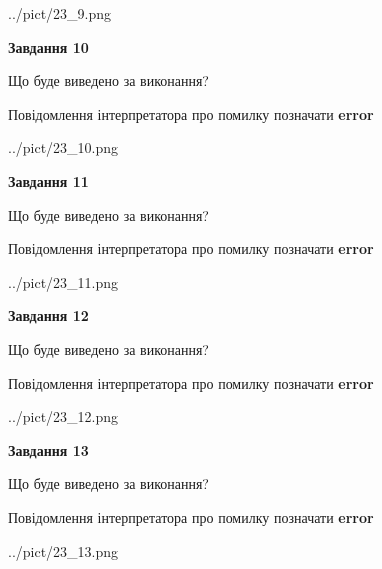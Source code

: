 \documentclass[11pt, ukrainian]{article}
\begin{document}
{\begin {large}
\begin{center}
	{../pict/23_9.png}
\end{center}
\newpage

{\begin {center}\textbf{Завдання 10}\end {center}}\par
Що буде виведено за виконання? \par
Повідомлення інтерпретатора про помилку позначати \textbf{error}

\begin{center}
	{../pict/23_10.png}
\end{center}
\newpage

{\begin {center}\textbf{Завдання 11}\end {center}}\par
Що буде виведено за виконання? \par
Повідомлення інтерпретатора про помилку позначати \textbf{error}

\begin{center}
	{../pict/23_11.png}
\end{center}
\newpage

{\begin {center}\textbf{Завдання 12}\end {center}}\par
Що буде виведено за виконання? \par
Повідомлення інтерпретатора про помилку позначати \textbf{error}

\begin{center}
	{../pict/23_12.png}
\end{center}
\newpage

{\begin {center}\textbf{Завдання 13}\end {center}}\par
Що буде виведено за виконання? \par
Повідомлення інтерпретатора про помилку позначати \textbf{error}

\begin{center}
	{../pict/23_13.png}
\end{center}
\newpage


\end{large}}
\end{document}
